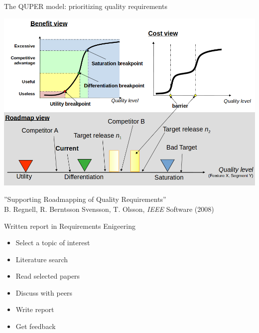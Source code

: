 \documentclass{beamer}
\begin{document}
\begin{frame}[fragile]{The QUPER model: prioritizing quality requirements}
\begin{center}
\includegraphics[width=1.0\textwidth]{img/quper}
\end{center}
{\footnotesize ''Supporting Roadmapping of Quality Requirements'' 
\\ B. Regnell, R. Berntsson Svensson, T. Olsson, \emph{IEEE} Software (2008)}
\end{frame}
  

\begin{frame}[fragile]{Written report in Requirements Enigeering}
\begin{itemize}
\item Select a topic of interest
\item Literature search
\item Read selected papers
\item Discuss with peers
\item Write report
\item Get feedback
\end{itemize}
\end{frame}
\end{document}
